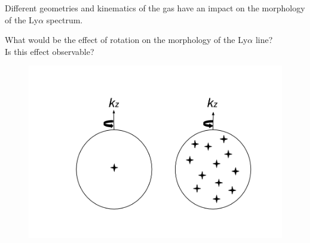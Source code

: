 \documentclass{beamer}
\begin{document}


\begin{frame}
\LARGE{Different geometries and kinematics of the gas have an impact on the morphology of the
Ly$\alpha$ spectrum.}\\

\end{frame}



\begin{frame}
\LARGE{What would be the effect of rotation on the morphology of the Ly$\alpha$ line?\\ 
Is this effect observable?} 
\end{frame}


\begin{frame}
\begin{figure}
\includegraphics[scale=0.3]{Figures/models.png}
\end{figure}
\end{frame}
\end{document}
